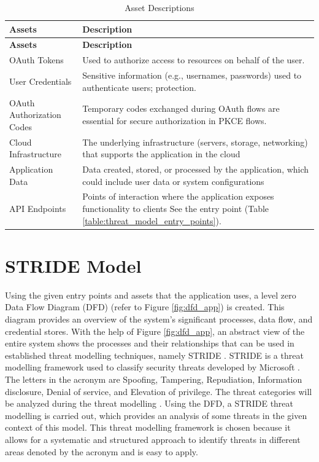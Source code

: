 \begin{longtable}{|p{8cm}|p{8cm}|}
\caption{Asset Descriptions}
\label{table:threat_model_assets}
\hline
\rowcolor{grey!15}
\textbf{Assets} & \textbf{Description} \\
\hline
\endfirsthead

\hline
\rowcolor{grey!15}
\textbf{Assets} & \textbf{Description} \\
\hline
\endhead

OAuth Tokens & Used to authorize access to resources on behalf of the user. \\
\hline
User Credentials & Sensitive information (e.g., usernames, passwords) used to authenticate users; protection. \\
\hline
OAuth Authorization Codes & Temporary codes exchanged during OAuth flows are essential for secure authorization in PKCE flows. \\
\hline
Cloud Infrastructure & The underlying infrastructure (servers, storage, networking) that supports the application in the cloud \\
\hline
Application Data & Data created, stored, or processed by the application, which could include user data or system configurations \\
\hline
API Endpoints & Points of interaction where the application exposes functionality to clients See the entry point (Table \ref{table:threat_model_entry_points}). \\
\hline

\end{longtable}


\section{STRIDE Model}
Using the given entry points and assets that the application uses, a level zero Data Flow Diagram (DFD) (refer to Figure \ref{fig:dfd_app}) is created. This diagram provides an overview of the system's significant processes, data flow, and credential stores. With the help of Figure \ref{fig:dfd_app}, an abstract view of the entire system shows the processes and their relationships that can be used in established threat modelling techniques, namely STRIDE \citep{dfd_stride}. STRIDE is a threat modelling framework used to classify security threats developed by Microsoft \citep{stride_usage}. The letters in the acronym are Spoofing, Tampering, Repudiation, Information disclosure, Denial of service, and Elevation of privilege. The threat categories will be analyzed during the threat modelling \citep{stride}. Using the DFD, a STRIDE threat modelling is carried out, which provides an analysis of some threats in the given context of this model. This threat modelling framework is chosen because it allows for a systematic and structured approach to identify threats in different areas denoted by the acronym and is easy to apply.



